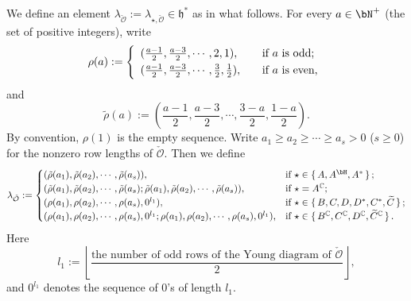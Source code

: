 \documentclass[12pt,a4paper]{amsart}
\def\abs#1{\left|{#1}\right|}
\newcommand{\CO}{{\mathcal {O}}}
\newcommand{\h}{\mathfrak h}
\numberwithin{equation}{section}
\theoremstyle{remark}
\begin{document}
We define an element  $\lambda_{\check \CO}:=\lambda_{\star, \check \CO} \in \h^*$  as in what follows. 
For every  $a\in \bN^+$ (the set of positive integers), write
\[
  \rho(a):=\left\{ \begin{array}{ll}
                  (\frac{a-1}{2}, \frac{a-3}{2}, \cdots, 2,1), \quad &\textrm{if $a$ is odd;}\smallskip\\
                    (\frac{a-1}{2}, \frac{a-3}{2}, \cdots, \frac{3}{2}, \frac{1}{2}), \quad &\textrm{if $a$ is even,}\\
                    \end{array}
                 \right. 
\]
and 
\[
   \tilde \rho(a):=
                  (\frac{a-1}{2}, \frac{a-3}{2}, \cdots, \frac{3-a}{2},\frac{1-a}{2}).                             
\]
By convention, $\rho(1)$ is the empty sequence. Write $a_1\geq  a_2\geq \cdots\geq a_s>0$ ($s\geq 0$)  for the nonzero row lengths of  $\check \CO$. Then we define
\[
  \lambda_{\check \CO}:= \begin{cases}
 (\tilde \rho( a_1), \tilde \rho(a_2),  \cdots, \tilde \rho(a_s)), & \text{if } \star \in \set{A, A^\bH, A^*};\\
  (\tilde \rho( a_1), \tilde \rho(a_2),  \cdots, \tilde \rho(a_s); \tilde \rho( a_1), \tilde \rho(a_2),  \cdots, \tilde \rho(a_s)), & \text{if } \star =A^\C;\\
  (\rho( a_1), \rho(a_2),  \cdots, \rho(a_s), 0^{l_1} ) , & \text{if } \star \in \set{B, C, D, D^*, C^*,\widetilde C};\\
(\rho( a_1), \rho(a_2),  \cdots, \rho(a_s), 0^{l_1} ;  \rho( a_1), \rho(a_2),  \cdots, \rho(a_s), 0^{l_1} ) , & \text{if } \star \in \set{B^\C, C^\C, D^\C, \widetilde C^\C}.\\
   \end{cases}
\]
Here 
\[
l_1:= \left\lfloor\frac{\textrm{the number of odd rows of the Young diagram of $\check \CO$}}{2}\right\rfloor, 
\]
and $0^{l_1}$ denotes the sequence of $0$'s of length $l_1$. 
\end{document}

